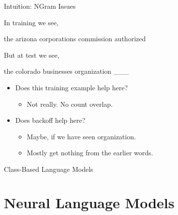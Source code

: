 \documentclass{beamer}
\begin{document}
\begin{frame}{Intuition: NGram Issues}
  
  In training we see, 

  \begin{center}
    the arizona corporations commission \alert{authorized}
  \end{center}

  But at test we see, 
  \begin{center}
    the colorado businesses organization \alert{\_\_\_}
  \end{center}
  \pause 
  
  \begin{itemize}
  \item Does this training example help here?
    \begin{itemize}
    \item Not really. No count overlap.
    \end{itemize}
    \air 
  \item Does backoff help here? 
    \begin{itemize}
    \item Maybe, if we have seen organization.
    \item Mostly get nothing from the earlier words.
    \end{itemize}
  \end{itemize}
\end{frame}


\begin{frame}{Class-Based Language Models}
  
\end{frame}

\section{Neural Language Models}
\end{document}
